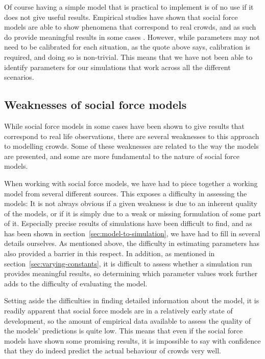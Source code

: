 Of course having a simple model that is practical to implement is of no use if 
it does not give useful results. Empirical studies have shown that social 
force models are able to show phenomena that correspond to real crowds, and as 
such do provide meaningful results in some cases \cite{self-org,HelbingNew}. 
However, while parameters may not need to be calibrated for each situation, as 
the quote above says, calibration is required, and doing so is non-trivial. 
This means that we have not been able to identify parameters for our 
simulations that work across all the different scenarios.

\subsection{Weaknesses of social force models}
While social force models in some cases have been shown to give results that 
correspond to real life observations, there are several weaknesses to this 
approach to modelling crowds. Some of these weaknesses are related to the way 
the models are presented, and some are more fundamental to the nature of 
social force models.

When working with social force models, we have had to piece together a working 
model from several different sources. This exposes a difficulty in assessing 
the models: It is not always obvious if a given weakness is due to an inherent 
quality of the models, or if it is simply due to a weak or missing formulation 
of some part of it. Especially precise results of simulations have been 
difficult to find, and as has been shown in 
section~\ref{sec:model-to-simulation}, we have had to fill in several details 
ourselves. As mentioned above, the difficulty in estimating parameters has 
also provided a barrier in this respect. In addition, as mentioned in 
section~\ref{sec:varying-constants}, it is difficult to assess whether a 
simulation run provides meaningful results, so determining which parameter 
values work further adds to the difficulty of evaluating the model.

Setting aside the difficulties in finding detailed information about the 
model, it is readily apparent that social force models are in a relatively 
early state of development, so the amount of empirical data available to 
assess the quality of the models' predictions is quite low. This means that 
even if the social force models have shown some promising results, it is 
impossible to say with confidence that they do indeed predict the actual 
behaviour of crowds very well.

